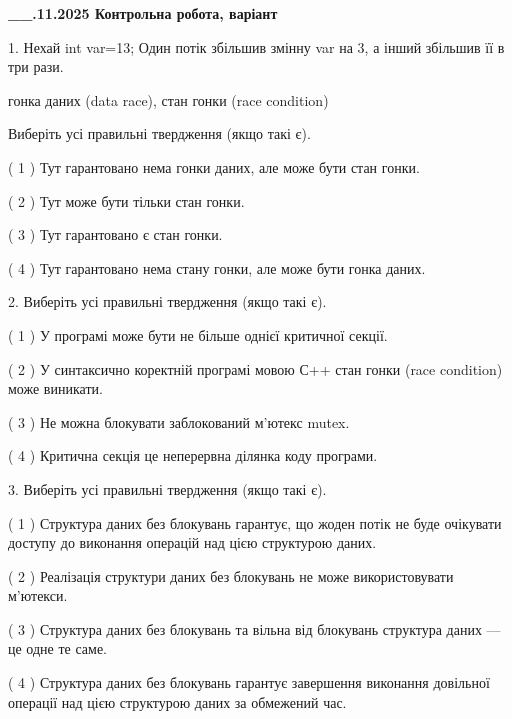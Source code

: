 \documentclass[12pt, ukrainian]{article}
\begin{document}
\newpage
\begin {large}

\textbf{\_\_.11.2025 Контрольна робота, варіант  }\par


{
1. Нехай int var=13; Один потік збільшив змінну var на 3, а інший збільшив її в три рази.

гонка даних (data race), стан гонки (race condition)

Виберіть усі правильні твердження (якщо такі є).\par
\vspace{2mm}
( 1 ) Тут гарантовано нема гонки даних, але може бути стан гонки.%

( 2 ) Тут може бути тільки стан гонки.%

( 3 ) Тут гарантовано є стан гонки.%

( 4 ) Тут гарантовано нема стану гонки, але може бути гонка даних.%


2. Виберіть усі правильні твердження (якщо такі є).\par
\vspace{2mm}

( 1 ) У програмі може бути не більше однієї критичної секції.%

( 2 ) У синтаксично коректній програмі мовою С++ стан гонки (race condition) може виникати.%

( 3 ) Не можна блокувати заблокований м’ютекс mutex.%

( 4 ) Критична секція це неперервна ділянка коду програми.%


3. Виберіть усі правильні твердження (якщо такі є).\par
\vspace{2mm}

( 1 ) Структура даних без блокувань гарантує, що жоден потік не буде очікувати доступу до виконання операцій над цією структурою даних.%

( 2 ) Реалізація структури даних без блокувань не може використовувати м’ютекси.%

( 3 ) Структура даних без блокувань та вільна від блокувань структура даних --- це одне те саме.%

( 4 ) Структура даних без блокувань гарантує завершення виконання довільної операції над цією структурою даних за обмежений час.%


}
\end{large}
\end{document}
